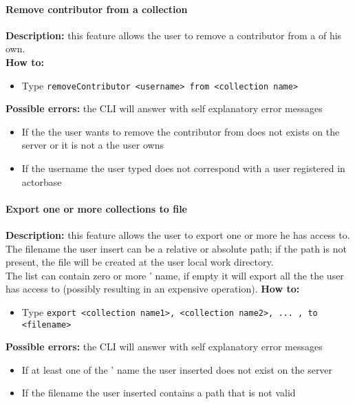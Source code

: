 \documentclass{scalatekids-article}
\begin{document}
\paragraph{Remove contributor from a collection}
\label{sec:removecontributor}
\textbf{Description:} this feature allows the user to remove a contributor from a  of his own.\\
\textbf{How to:}
\begin{itemize}
\item Type \texttt{removeContributor <username> from <collection name>}
\end{itemize}
\textbf{Possible errors:} the CLI will answer with self explanatory error messages
\begin{itemize}
\item If the  the user wants to remove the contributor from does not exists on the server or it is not a  the user owns
\item If the username the user typed does not correspond with a user registered in actorbase
\end{itemize}

\paragraph{Export one or more collections to file}
\label{sec:export}
\textbf{Description:} this feature allows the user to export one or more  he has access to.\\
The filename the user insert can be a relative or absolute path; if the path is not present, the file will be created at the user local work directory.\\
The  list can contain zero or more ' name, if empty it will export all the  the user has access to (possibly resulting in an expensive operation).
\textbf{How to:}
\begin{itemize}
\item Type \texttt{export <collection name1>, <collection name2>, ... , to <filename>}
\end{itemize}
\textbf{Possible errors:} the CLI will answer with self explanatory error messages
\begin{itemize}
\item If at least one of the ' name the user inserted does not exist on the server
\item If the filename the user inserted contains a path that is not valid
\end{itemize}
\end{document}
